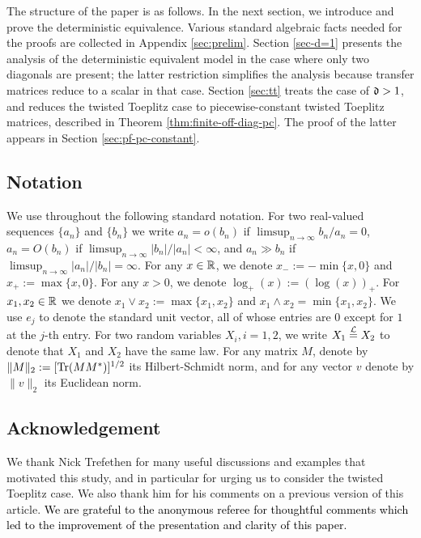 \documentclass{amsart}
\numberwithin{equation}{section}
\def\corAB{}
\def\corABa{}
\def\corOZ{}
\def\corABrev{\textcolor{black}}
\begin{document}
The structure of the paper is as follows. In the next section, we introduce
and prove the deterministic equivalence. Various standard
algebraic
facts needed for the proofs are collected in Appendix \ref{sec:prelim}.
Section
\ref{sec-d=1} presents the analysis of the deterministic equivalent model in
the case where only two diagonals are present; the latter restriction simplifies
the analysis because transfer matrices reduce to a scalar in that case. Section \ref{sec:tt} treats the case of \corAB{$\mathfrak{d}>1$}, and reduces the twisted Toeplitz
case to
piecewise-constant twisted Toeplitz matrices,
described in Theorem \ref{thm:finite-off-diag-pc}.
The proof of the latter appears in
Section \ref{sec:pf-pc-constant}.\\[0.2em]

\subsection{Notation}
\corOZ{We use throughout the following standard notation.}
\corAB{For two real-valued sequences $\{a_n\}$ and $\{b_n\}$ we write
$a_n=o(b_n)$ if $\limsup_{n\to\infty} b_n/a_n=0$,
$a_n=O(b_n)$ if $\limsup_{n\to\infty} |b_n|/|a_n|<\infty$,
 and
 $a_n \gg b_n$ if $\limsup_{n \to \infty} |a_n|/|b_n| =\infty$.}
\corOZ{For any $x \in \mathbb{R}$, we denote $x_-:=-\min\{x, 0\}$ and $x_+:=\max\{x,0\}$.}
\corAB{For any $x >0$, we denote $\log_+(x):=(\log(x))_+$.}
\corOZ{For $x_1, x_2 \in \mathbb{R}$ we denote $x_1 \vee x_2:=\max\{x_1,x_2\}$ and
 $x_1 \wedge x_2=\min\{x_1,x_2\}$.}
 \corOZ{We use $e_j$ to denote the standard unit vector, all of whose entries are $0$ except for $1$ at the $j$-th entry.}
\corOZ{For two random variables $X_i, i=1,2$, we write $X_1 \overset{\mathcal{L}}{=} X_2$ to denote that $X_1$ and $X_2$ have the same law.} \corABa{For any matrix $M$,
  denote by $\|M\|_2:=[{\rm Tr}(M M^*)]^{1/2}$ its Hilbert-Schmidt norm,
and for any vector $v$ denote by  $\|v\|_2$ its Euclidean norm}.


\subsection*{Acknowledgement}
We thank Nick Trefethen for many useful discussions and examples that
motivated this study, and in particular for urging us to consider the
twisted Toeplitz case. We also thank him for his comments on a previous version
of this article. \corABrev{We are grateful to the anonymous referee for thoughtful comments which led to the improvement of the presentation and clarity of this paper.}
\end{document}
